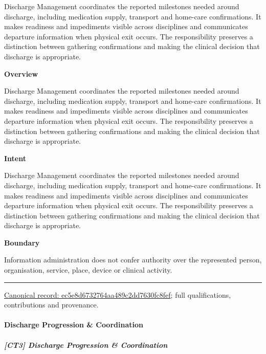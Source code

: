 Discharge Management coordinates the reported milestones needed around discharge, including medication supply, transport and home-care confirmations. It makes readiness and impediments visible across disciplines and communicates departure information when physical exit occurs. The responsibility preserves a distinction between gathering confirmations and making the clinical decision that discharge is appropriate.



\textbf{Overview}



Discharge Management coordinates the reported milestones needed around discharge, including medication supply, transport and home-care confirmations. It makes readiness and impediments visible across disciplines and communicates departure information when physical exit occurs. The responsibility preserves a distinction between gathering confirmations and making the clinical decision that discharge is appropriate.



\textbf{Intent}



Discharge Management coordinates the reported milestones needed around discharge, including medication supply, transport and home-care confirmations. It makes readiness and impediments visible across disciplines and communicates departure information when physical exit occurs. The responsibility preserves a distinction between gathering confirmations and making the clinical decision that discharge is appropriate.



\textbf{Boundary}



Information administration does not confer authority over the represented person, organisation, service, place, device or clinical activity.



\medskip\hrule\medskip

{\footnotesize \href{../../../../continuum/strategy/capability/ec5e8d6732764aa489c2dd7630fc8fef.md}{Canonical record: ec5e8d6732764aa489c2dd7630fc8fef}; full qualifications, contributions and provenance.}\par
\paragraph{Discharge Progression \& Coordination}

\subparagraph{[CT3] Discharge Progression \& Coordination}

